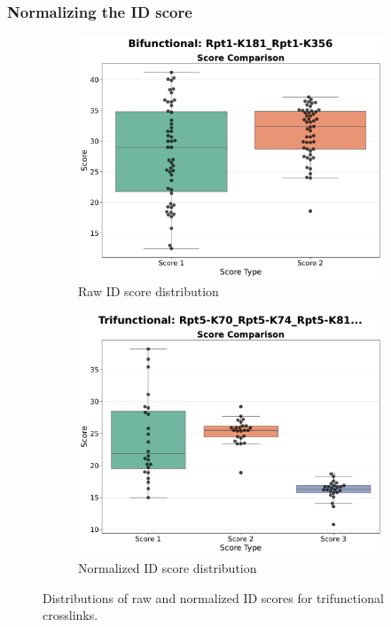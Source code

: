 \documentclass[a4paper,8pt]{beamer}
\begin{document}
\begin{frame}
\frametitle{Normalizing the ID score}
\begin{figure}
    \centering
    \begin{subfigure}[b]{0.45\textwidth}
        \centering
        \includegraphics[width=\textwidth]{figures/bifunctional_score_freq.pdf}
        \caption{Raw ID score distribution}
    \end{subfigure}
    \hfill
    \begin{subfigure}[b]{0.45\textwidth}
        \centering
        \includegraphics[width=\textwidth]{figures/trifunctional_score_freq.pdf}
        \caption{Normalized ID score distribution}
    \end{subfigure}
    \caption{Distributions of raw and normalized ID scores for trifunctional crosslinks.}
\end{figure}
\end{frame}
\end{document}
